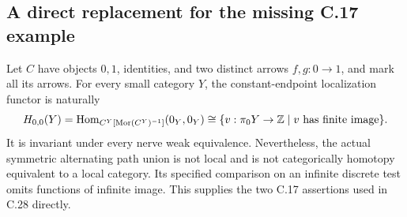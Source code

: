 \subsection{A direct replacement for the missing C.17 example}
\begin{theorem}
\label{F:C17-fence}
Let $C$ have objects $0,1$, identities, and two distinct arrows
$f,g:0\to1$, and mark all its arrows. For every small category $Y$,
the constant-endpoint localization functor is naturally
\[
 H_{0,0}(Y)=
 \operatorname{Hom}_{C^Y[\operatorname{Mor}(C^Y)^{-1}]}(0_Y,0_Y)
 \cong\{v:\pi_0Y\to\mathbb Z\mid v\text{ has finite image}\}.
\]
It is invariant under every nerve weak equivalence. Nevertheless,
the actual symmetric alternating path union is not local and is not
categorically homotopy equivalent to a local category. Its specified
comparison on an infinite discrete test omits functions of infinite
image. This supplies the two C.17 assertions used in C.28 directly.
\end{theorem}
